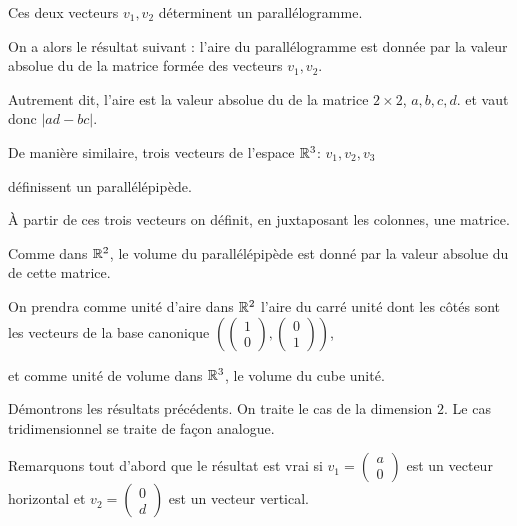 \change
Ces deux vecteurs $v_1,v_2$ déterminent un parallélogramme.

\change
On a alors le résultat suivant : l'aire du parallélogramme est 
donnée par la valeur absolue du \deter de la matrice formée 
des vecteurs $v_1,v_2$.

Autrement dit, l'aire  est la valeur absolue du \deter de la matrice
$2\times 2$, $a, b, c, d$. et vaut donc $|ad-bc|$.


\diapo
De manière similaire, trois vecteurs de l'espace $\mathbb{R}^3$:
$v_1, v_2, v_3$

\change
définissent un parallélépipède.

\change
\`A partir de ces trois vecteurs on définit, en juxtaposant les colonnes, 
une matrice.


\diapo

Comme dans $\mathbb{R}^2$, le volume du parallélépipède est donné par la valeur absolue du \deter
de cette matrice.

\change
On prendra comme unité d'aire dans $\mathbb{R}^2$ l'aire du carré unité dont 
les côtés sont les vecteurs de la base canonique 
$\left(\left(\begin{smallmatrix} 1 \\[5pt]  0 \end{smallmatrix} \right),
\left(\begin{smallmatrix} 0 \\[5pt]  1 \end{smallmatrix} \right)\right)$, 

\change
et comme unité de volume dans $\mathbb{R}^3$, 
le volume du cube unité.

\diapo

Démontrons les résultats précédents. On traite le cas de la dimension $2$. 
Le cas tridimensionnel se traite de façon analogue.

\change
Remarquons tout d'abord que le résultat est vrai si 
$v_1=\left(\begin{smallmatrix}a \\[5pt] 0\end{smallmatrix}\right)$ est un vecteur horizontal
 et $v_2=\left(\begin{smallmatrix}0\\[5pt] d\end{smallmatrix}\right)$ est un vecteur vertical.

